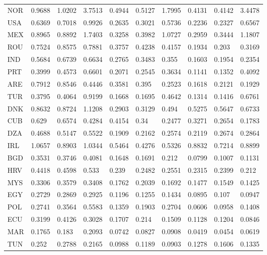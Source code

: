 \begin{table}[ht]
\begin{tabular}{llllllllll}
  NOR & 0.9688 & 1.0202 & 3.7513 & 0.4944 & 0.5127 & 1.7995 & 0.4131 & 0.4142 & 3.4478 \\ 
  USA & 0.6369 & 0.7018 & 0.9926 & 0.2635 & 0.3021 & 0.5736 & 0.2236 & 0.2327 & 0.6567 \\ 
  MEX & 0.8965 & 0.8892 & 1.7403 & 0.3258 & 0.3982 & 1.0727 & 0.2959 & 0.3444 & 1.1807 \\ 
  ROU & 0.7524 & 0.8575 & 0.7881 & 0.3757 & 0.4238 & 0.4157 & 0.1934 & 0.203 & 0.3169 \\ 
  IND & 0.5684 & 0.6739 & 0.6634 & 0.2765 & 0.3483 & 0.355 & 0.1603 & 0.1954 & 0.2354 \\ 
  PRT & 0.3999 & 0.4573 & 0.6601 & 0.2071 & 0.2545 & 0.3634 & 0.1141 & 0.1352 & 0.4092 \\ 
  ARE & 0.7912 & 0.8546 & 0.4446 & 0.3581 & 0.395 & 0.2523 & 0.1618 & 0.2121 & 0.1929 \\ 
  TUR & 0.3795 & 0.4064 & 0.9199 & 0.1668 & 0.1695 & 0.4642 & 0.1314 & 0.1416 & 0.6761 \\ 
  DNK & 0.8632 & 0.8724 & 1.1208 & 0.2903 & 0.3129 & 0.494 & 0.5275 & 0.5647 & 0.6733 \\ 
  CUB & 0.629 & 0.6574 & 0.4284 & 0.4154 & 0.34 & 0.2477 & 0.3271 & 0.2654 & 0.1783 \\ 
  DZA & 0.4688 & 0.5147 & 0.5522 & 0.1909 & 0.2162 & 0.2574 & 0.2119 & 0.2674 & 0.2864 \\ 
  IRL & 1.0657 & 0.8903 & 1.0344 & 0.5464 & 0.4276 & 0.5326 & 0.8832 & 0.7214 & 0.8899 \\ 
  BGD & 0.3531 & 0.3746 & 0.4081 & 0.1648 & 0.1691 & 0.212 & 0.0799 & 0.1007 & 0.1131 \\ 
  HRV & 0.4418 & 0.4598 & 0.533 & 0.239 & 0.2482 & 0.2551 & 0.2315 & 0.2399 & 0.212 \\ 
  MYS & 0.3306 & 0.3579 & 0.3408 & 0.1762 & 0.2039 & 0.1692 & 0.1477 & 0.1549 & 0.1425 \\ 
  EGY & 0.2729 & 0.2869 & 0.2925 & 0.1196 & 0.1255 & 0.1434 & 0.0895 & 0.107 & 0.0947 \\ 
  POL & 0.2741 & 0.3564 & 0.5583 & 0.1359 & 0.1903 & 0.2704 & 0.0606 & 0.0958 & 0.1408 \\ 
  ECU & 0.3199 & 0.4126 & 0.3028 & 0.1707 & 0.214 & 0.1509 & 0.1128 & 0.1204 & 0.0846 \\ 
  MAR & 0.1765 & 0.183 & 0.2093 & 0.0742 & 0.0827 & 0.0908 & 0.0419 & 0.0454 & 0.0619 \\ 
  TUN & 0.252 & 0.2788 & 0.2165 & 0.0988 & 0.1189 & 0.0903 & 0.1278 & 0.1606 & 0.1335 \\ 

\end{tabular}
\end{table}

